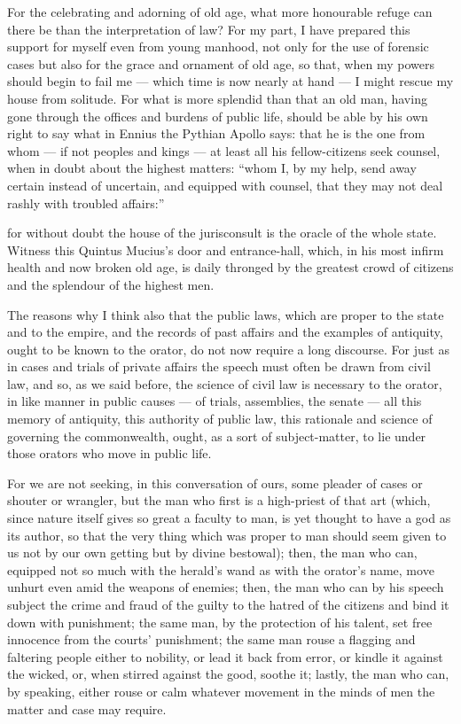  For the celebrating and adorning of old age, what more honourable refuge can there be than the interpretation of law? For my part, I have prepared this support for myself even from young manhood, not only for the use of forensic cases but also for the grace and ornament of old age, so that, when my powers should begin to fail me — which time is now nearly at hand — I might rescue my house from solitude. For what is more splendid than that an old man, having gone through the offices and burdens of public life, should be able by his own right to say what in Ennius the Pythian Apollo says: that he is the one from whom — if not peoples and kings — at least all his fellow-citizens seek counsel, when in doubt about the highest matters: ``whom I, by my help, send away certain instead of uncertain, and equipped with counsel, that they may not deal rashly with troubled affairs:''

 for without doubt the house of the jurisconsult is the oracle of the whole state. Witness this Quintus Mucius's door and entrance-hall, which, in his most infirm health and now broken old age, is daily thronged by the greatest crowd of citizens and the splendour of the highest men.

 The reasons why I think also that the public laws, which are proper to the state and to the empire, and the records of past affairs and the examples of antiquity, ought to be known to the orator, do not now require a long discourse. For just as in cases and trials of private affairs the speech must often be drawn from civil law, and so, as we said before, the science of civil law is necessary to the orator, in like manner in public causes — of trials, assemblies, the senate — all this memory of antiquity, this authority of public law, this rationale and science of governing the commonwealth, ought, as a sort of subject-matter, to lie under those orators who move in public life.

 For we are not seeking, in this conversation of ours, some pleader of cases or shouter or wrangler, but the man who first is a high-priest of that art (which, since nature itself gives so great a faculty to man, is yet thought to have a god as its author, so that the very thing which was proper to man should seem given to us not by our own getting but by divine bestowal); then, the man who can, equipped not so much with the herald's wand as with the orator's name, move unhurt even amid the weapons of enemies; then, the man who can by his speech subject the crime and fraud of the guilty to the hatred of the citizens and bind it down with punishment; the same man, by the protection of his talent, set free innocence from the courts' punishment; the same man rouse a flagging and faltering people either to nobility, or lead it back from error, or kindle it against the wicked, or, when stirred against the good, soothe it; lastly, the man who can, by speaking, either rouse or calm whatever movement in the minds of men the matter and case may require.

